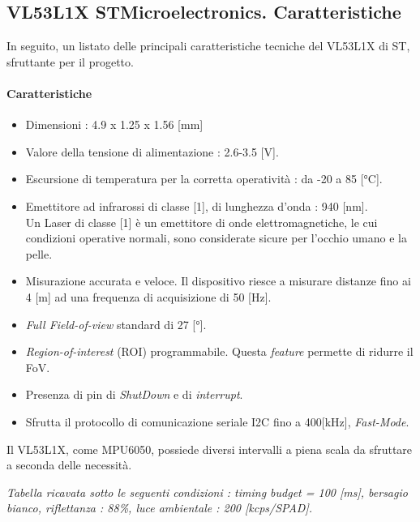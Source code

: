 \subsection{VL53L1X STMicroelectronics. Caratteristiche}
In seguito, un listato delle principali caratteristiche tecniche del VL53L1X di ST, sfruttante per il progetto.\\
\paragraph{Caratteristiche}
\begin{itemize}
\item Dimensioni : 4.9 x 1.25 x 1.56 [mm]
\item Valore della tensione di alimentazione : 2.6-3.5 [V].
\item Escursione di temperatura per la corretta operatività : da -20 a 85 [°C].
\item Emettitore ad infrarossi di classe [1], di lunghezza d'onda : 940 [nm]. \\Un Laser di classe [1] è un emettitore di onde elettromagnetiche, le cui condizioni operative normali, sono considerate sicure per l'occhio umano e la pelle.
\item Misurazione accurata e veloce. Il dispositivo riesce a misurare distanze fino ai 4 [m] ad una frequenza di acquisizione di 50 [Hz].
\item \textit{Full Field-of-view} standard di 27 [°].
\item \textit{Region-of-interest} (ROI) programmabile. Questa \textit{feature} permette di ridurre il FoV.
\item Presenza di pin di \textit{ShutDown} e di \textit{interrupt}.
\item Sfrutta il protocollo di comunicazione seriale I2C fino a 400[kHz], \textit{Fast-Mode}.
\end{itemize}
Il VL53L1X, come MPU6050, possiede diversi intervalli a piena scala da sfruttare a seconda delle necessità.
\begin{table}[H]
    \centering
    \caption{\textit{Distance mode} del VL53L1X STMicroelectronics.}
    \label{tab: tabella}
\end{table}
\begin{center}
    \footnotesize \textit{Tabella ricavata sotto le seguenti condizioni : \textit{timing budget} = 100 [ms], bersagio bianco, riflettanza : 88\%, luce ambientale : 200 [kcps/SPAD].}
\end{center}

